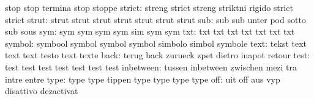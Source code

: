                            stop                      stop
                           termina                   stop
                           stoppe
                   strict: streng                    strict
                           streng                    striktni
                           rigido                    strict
                           strict
                    strut: strut                     strut
                           strut                     strut
                           strut                     strut
                           strut
                      sub: sub                       sub
                           unter                     pod
                           sotto                     sub
                           sous
                      sym: sym                       sym
                           sym                       sym
                           sim                       sym
                           sym
                      txt: txt                       txt
                           txt                       txt
                           txt                       txt
                           txt
                   symbol: symbool                   symbol
                           symbol                    symbol
                           simbolo                   simbol
                           symbole
                     text: tekst                     text
                           text                      text
                           testo                     text
                           texte
                     back: terug                     back
                           zurueck                   zpet
                           dietro                    inapot
                           retour
                     test: test                      test
                           test                      test
                           test                      test
                           test
                inbetween: tussen                    inbetween
                           zwischen                  mezi
                           tra                       intre
                           entre
                     type: type                      type
                           tippen                    type
                           type                      type
                           type
                      off: uit                       off
                           aus                       vyp
                           disattivo                 dezactivat
